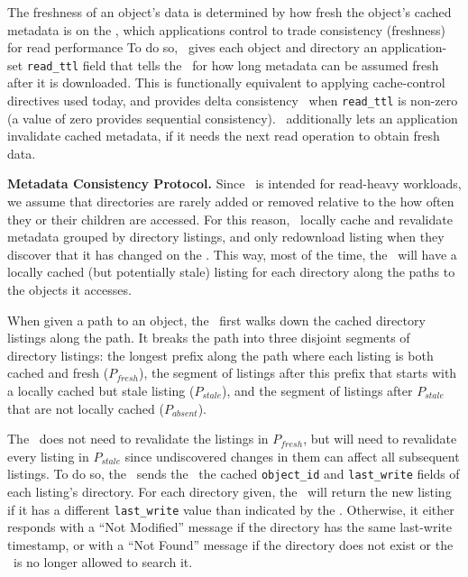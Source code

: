 The freshness of an object's data is determined by how fresh the 
object's cached metadata is on the \SG, which applications
control to trade consistency (freshness) for read performance
To do so, \Syndicate\ gives each object and directory an
application-set {\tt read\_ttl} field that
tells the \SG\ for how long metadata can be assumed fresh after it is downloaded.
This is functionally equivalent to applying cache-control directives used today,
and provides delta consistency~\cite{delta-consistency} when {\tt read\_ttl} is non-zero
(a value of zero provides sequential consistency).
\Syndicate\ additionally lets an application invalidate cached metadata,
if it needs the next read operation to obtain fresh data.

{\bf Metadata Consistency Protocol.}  Since \Syndicate\ is intended for
read-heavy workloads, we assume
that directories are rarely added or removed relative to the
how often they or their children are accessed.  For this reason,
\SGs\ locally cache and revalidate metadata grouped by 
directory listings, and only redownload listing when they discover that 
it has changed on the \MS.  This way, most of the time, the \SG\ will 
have a locally cached (but potentially stale) listing for each directory
along the paths to the objects it accesses.

When given a path to an object, the \SG\ 
first walks down the cached directory listings along the path.
It breaks the path into three disjoint segments 
of directory listings:  the longest prefix along the path where each listing is both
cached and fresh ($P_{fresh}$), the segment of listings after this prefix that starts
with a locally cached but stale listing ($P_{stale}$), and the segment of
listings after $P_{stale}$ that are not locally cached ($P_{absent}$).


The \SG\ does not need to revalidate the listings in $P_{fresh}$, but will need to revalidate 
every listing in $P_{stale}$ since
undiscovered changes in them can affect all subsequent listings.  To do so,
the \SG\ sends the \MS\ the cached {\tt object\_id} and {\tt last\_write} fields of each
listing's directory.  For each directory given, the \MS\ will return the new listing if it has 
a different {\tt last\_write} value than indicated by the \SG. 
Otherwise, it either responds with a
``Not Modified'' message if the directory has the same last-write timestamp,
or with a ``Not Found'' message if the directory does not exist or the \SG\
is no longer allowed to search it.

